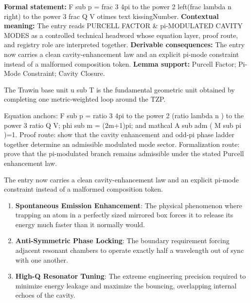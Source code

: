 \begingroup\footnotesize\setlength{\emergencystretch}{3em}\sloppy
\textbf{Formal statement:} F sub p = frac 3 4pi to the power 2 left(frac lambda n right) to the power 3 frac Q V otimes text kissingNumber. \textbf{Contextual meaning:} The entry reads PURCELL FACTOR \& pi-MODULATED CAVITY MODES as a controlled technical headword whose equation layer, proof route, and registry role are interpreted together. \textbf{Derivable consequences:} The entry now carries a clean cavity-enhancement law and an explicit pi-mode constraint instead of a malformed composition token. \textbf{Lemma support:} Purcell Factor; Pi-Mode Constraint; Cavity Closure.\par
\endgroup

The Trawin base unit u sub T is the fundamental geometric unit obtained by completing one metric-weighted loop around the TZP.

Equation anchors: F sub p = ratio 3 4pi to the power 2 (ratio lambda n ) to the power 3 ratio Q V; phi sub m = (2m+1)pi; and mathcal A sub adm ( M sub pi )=1. Proof route: show that the cavity enhancement and odd-pi phase ladder together determine an admissible modulated mode sector. Formalization route: prove that the pi-modulated branch remains admissible under the stated Purcell enhancement law.

The entry now carries a clean cavity-enhancement law and an explicit pi-mode constraint instead of a malformed composition token.
\endgroup

\begin{enumerate}[leftmargin=1.6em,itemsep=6pt,topsep=4pt]
\item \textbf{Spontaneous Emission Enhancement}: The physical phenomenon where trapping an atom in a perfectly sized mirrored box forces it to release its energy much faster than it normally would.
\item \textbf{Anti-Symmetric Phase Locking}: The boundary requirement forcing adjacent resonant chambers to operate exactly half a wavelength out of sync with one another.
\item \textbf{High-Q Resonator Tuning}: The extreme engineering precision required to minimize energy leakage and maximize the bouncing, overlapping internal echoes of the cavity.
\end{enumerate}

